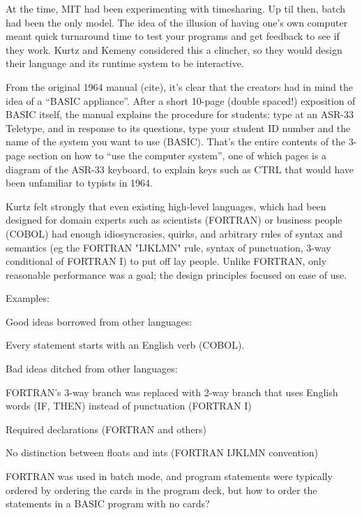\documentclass{article}
\begin{document}
At the time, MIT had been experimenting with timesharing.
 Up til then,
batch had been the only model.  The idea of the illusion of having one's
own computer meant quick turnaround time to test your programs and get
feedback to see if they work.  Kurtz and Kemeny considered this a
clincher, so they would design their language and its runtime system to
be interactive.

From the original 1964 manual (cite), it's clear that the creators had
in mind the idea of a ``BASIC appliance''.  After a short 10-page
(double spaced!) exposition of BASIC itself, the manual
explains the procedure for students: type  at an ASR-33
Teletype, and in response to its questions, type your student ID number
and the name of the system you want to use (BASIC).  That's the entire
contents of the  3-page section on how to ``use the computer system'',
one of which pages is a diagram of the ASR-33 keyboard,
to explain keys such as CTRL that would have been unfamiliar to
typists in 1964.


Kurtz felt strongly that even existing high-level
languages, which had been designed for domain experts such as scientists
(FORTRAN) or business people (COBOL) 
had enough idiosyncrasies, quirks, and arbitrary rules of syntax and
semantics (eg the FORTRAN "IJKLMN" rule, syntax of punctuation, 3-way
conditional of FORTRAN I) to put off lay people.  Unlike FORTRAN,
only reasonable performance was a goal; the design principles focused on
ease of use.


Examples:

Good ideas borrowed from other languages:

Every statement starts with an English verb (COBOL).

Bad ideas ditched from other languages:

FORTRAN's 3-way branch was replaced with 2-way branch that uses English words (IF,
THEN) instead of punctuation (FORTRAN I)

Required declarations (FORTRAN and others)

No distinction between floats and ints (FORTRAN IJKLMN convention)

FORTRAN was used in batch mode, and program statements were typically
ordered by ordering the cards in the program deck, but how to order the
statements in a BASIC program with no cards?
\end{document}

